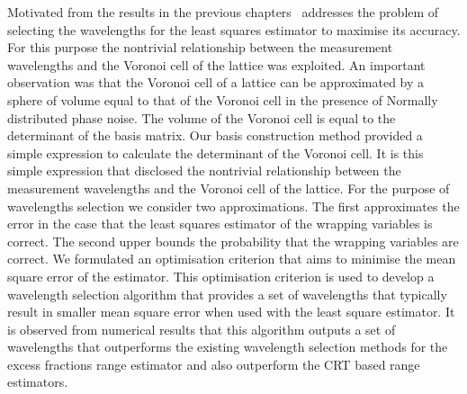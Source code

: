 Motivated from the results in the previous chapters~ addresses the problem of selecting the wavelengths for the least squares estimator to maximise its accuracy. For this purpose the nontrivial relationship between the measurement wavelengths and the Voronoi cell of the lattice was exploited.  An important observation was that the Voronoi cell of a lattice can be approximated by a sphere of volume equal to that of the Voronoi cell in the presence of Normally distributed phase noise. The volume of the Voronoi cell is equal to the determinant of the basis matrix. Our basis construction method provided a simple expression to calculate the determinant of the Voronoi cell. It is this simple expression that disclosed the nontrivial relationship between the measurement wavelengths and the Voronoi cell of the lattice. For the purpose of wavelengths selection we consider two approximations. The first approximates the error in the case that the least squares estimator of the wrapping variables is correct. The second upper bounds the probability that the wrapping variables are correct. We formulated an optimisation criterion that aims to minimise the mean square error of the estimator. This optimisation criterion is used to develop a wavelength selection algorithm that provides a set of wavelengths that typically result in smaller mean square error when used with the least square estimator. It is observed from numerical results that this algorithm outputs a set of wavelengths that outperforms the existing wavelength selection methods for the excess fractions range estimator and also outperform the CRT based range estimators.






























